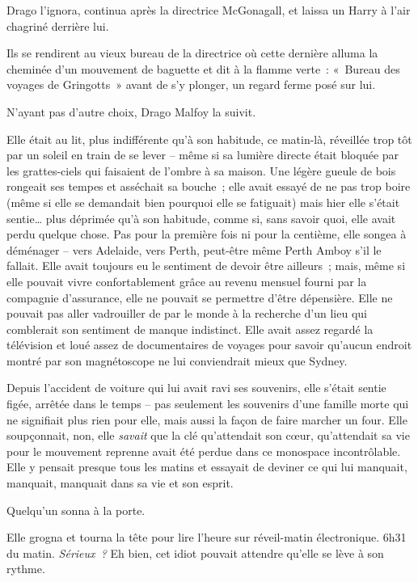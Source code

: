Drago l'ignora, continua après la directrice McGonagall, et laissa un Harry à l'air chagriné derrière lui.

Ils se rendirent au vieux bureau de la directrice où cette dernière alluma la cheminée d'un mouvement de baguette et dit à la flamme verte~: «~Bureau des voyages de Gringotts~» avant de s'y plonger, un regard ferme posé sur lui.

N'ayant pas d'autre choix, Drago Malfoy la suivit.

\later

Elle était au lit, plus indifférente qu'à son habitude, ce matin-là, réveillée trop tôt par un soleil en train de se lever -- même si sa lumière directe était bloquée par les grattes-ciels qui faisaient de l'ombre à sa maison.
Une légère gueule de bois rongeait ses tempes et asséchait sa bouche~; elle avait essayé de ne pas trop boire (même si elle se demandait bien pourquoi elle se fatiguait) mais hier elle s'était sentie… plus déprimée qu'à son habitude, comme si, sans savoir quoi, elle avait perdu quelque chose.
Pas pour la première fois ni pour la centième, elle songea à déménager -- vers Adelaide, vers Perth, peut-être même Perth Amboy s'il le fallait.
Elle avait toujours eu le sentiment de devoir être ailleurs~; mais, même si elle pouvait vivre confortablement grâce au revenu mensuel fourni par la compagnie d'assurance, elle ne pouvait se permettre d'être dépensière.
Elle ne pouvait pas aller vadrouiller de par le monde à la recherche d'un lieu qui comblerait son sentiment de manque indistinct.
Elle avait assez regardé la télévision et loué assez de documentaires de voyages pour savoir qu'aucun endroit montré par son magnétoscope ne lui conviendrait mieux que Sydney.

Depuis l'accident de voiture qui lui avait ravi ses souvenirs, elle s'était sentie figée, arrêtée dans le temps -- pas seulement les souvenirs d'une famille morte qui ne signifiait plus rien pour elle, mais aussi la façon de faire marcher un four.
Elle soupçonnait, non, elle \emph{savait} que la clé qu'attendait son cœur, qu'attendait sa vie pour le mouvement reprenne avait été perdue dans ce monospace incontrôlable.
Elle y pensait presque tous les matins et essayait de deviner ce qui lui manquait, manquait, manquait dans sa vie et son esprit.

Quelqu'un sonna à la porte.

Elle grogna et tourna la tête pour lire l'heure sur réveil-matin électronique.
6h31 du matin.
\emph{Sérieux~?} Eh bien, cet idiot pouvait attendre qu'elle se lève à son rythme.

